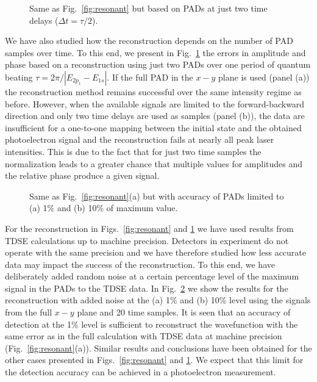 \begin{figure}[t]
\centering
\caption{
Same as Fig.\ \ref{fig:resonant} but based on PADs at just two time delays
($\Delta t=\tau/2$).
} 
  \label{fig:twosamples}
\end{figure}

We have also studied how the reconstruction depends on the number of PAD samples over time. To this end, we present in Fig.\ \ref{fig:twosamples} the errors in amplitude and phase based on a reconstruction using just two PADs over one period of quantum beating $\tau = 2\pi / |E_{2p_1}-E_{1s}|$. If the full PAD in the $x-y$ plane is used (panel (a)) the reconstruction method remains successful over the same intensity regime as before. However, when the available signals are limited to the forward-backward direction and only two time delays are used as samples (panel (b)), the data are insufficient for a one-to-one mapping between the initial state and the obtained photoelectron signal and the reconstruction fails at nearly all peak laser intensities. This is due to the fact that for just two time samples the normalization leads to a greater chance that multiple values for amplitudes and the relative phase produce a given signal.

\begin{figure}[t]
\centering
\caption{Same as Fig.\ \ref{fig:resonant}(a) but with accuracy of PADs limited to (a) 1\% and (b) 10\% of maximum value.
}
  \label{fig:detector}
\end{figure}

For the reconstruction in Figs.\ \ref{fig:resonant} and \ref{fig:twosamples} we have used results from TDSE calculations up to machine precision. Detectors in experiment do not operate with the same precision and we have therefore studied how less accurate data may impact the success of the reconstruction. To this end, we have deliberately added random noise at a certain percentage level of the maximum signal in the PADs to the TDSE data. In Fig.\ \ref{fig:detector} we show the results for the reconstruction with added noise at the (a) 1\% and (b) 10\% level using the signals from the full $x-y$ plane and 20 time samples. It is seen that an accuracy of detection at the 1\% level is sufficient to reconstruct the wavefunction with the same error as in the full calculation with TDSE data at machine precision (Fig.\ \ref{fig:resonant}(a)). Similar results and conclusions have been obtained for the other cases presented in Figs.\ \ref{fig:resonant} and \ref{fig:twosamples}. We expect that this limit for the detection accuracy can be achieved in a photoelectron measurement.

